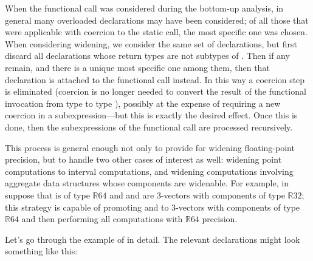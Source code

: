 When the functional call was considered during the bottom-up analysis,
in general many overloaded declarations may have been considered; of
all those that were applicable with coercion
to the static call, the most specific one was chosen.
When considering widening, we consider the same set of declarations, but
first discard all declarations whose return types are not subtypes of
.  Then if any remain, and there is a unique most specific one
among them, then that declaration is attached to the functional call
instead.  In this way a coercion step is eliminated (coercion is no
longer needed to convert the result of the functional invocation from
type  to type ), possibly at the expense of requiring
a new coercion in a subexpression---but this is exactly the desired
effect.  Once this is done, then the subexpressions of the functional
call are processed recursively.


This process is general enough not only to provide for
widening floating-point precision, but to handle two other cases
of interest as well: widening point computations to interval computations,
and widening computations involving aggregate data structures whose
components are widenable.  For example, in  suppose that
 is of type $\mathbb{R}64$ and  and  are 3-vectors with components
of type $\mathbb{R}32$; this strategy is capable of promoting  and 
to 3-vectors with components of type $\mathbb{R}64$ and then performing all
computations with $\mathbb{R}64$ precision.

Let's go through the example of  in detail.
The relevant declarations might look something like this:
%

